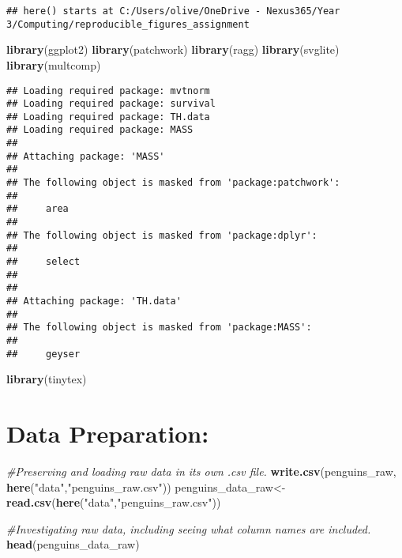 \documentclass[
]{article}
\newenvironment{Shaded}{\begin{snugshade}}{\end{snugshade}}
\newcommand{\CommentTok}[1]{\textcolor[rgb]{0.56,0.35,0.01}{\textit{#1}}}
\newcommand{\FunctionTok}[1]{\textcolor[rgb]{0.13,0.29,0.53}{\textbf{#1}}}
\newcommand{\NormalTok}[1]{#1}
\newcommand{\OtherTok}[1]{\textcolor[rgb]{0.56,0.35,0.01}{#1}}
\newcommand{\StringTok}[1]{\textcolor[rgb]{0.31,0.60,0.02}{#1}}
\begin{document}
\begin{verbatim}
## here() starts at C:/Users/olive/OneDrive - Nexus365/Year 3/Computing/reproducible_figures_assignment
\end{verbatim}

\begin{Shaded}
\begin{Highlighting}[]
\FunctionTok{library}\NormalTok{(ggplot2)}
\FunctionTok{library}\NormalTok{(patchwork)}
\FunctionTok{library}\NormalTok{(ragg)}
\FunctionTok{library}\NormalTok{(svglite)}
\FunctionTok{library}\NormalTok{(multcomp)}
\end{Highlighting}
\end{Shaded}

\begin{verbatim}
## Loading required package: mvtnorm
## Loading required package: survival
## Loading required package: TH.data
## Loading required package: MASS
## 
## Attaching package: 'MASS'
## 
## The following object is masked from 'package:patchwork':
## 
##     area
## 
## The following object is masked from 'package:dplyr':
## 
##     select
## 
## 
## Attaching package: 'TH.data'
## 
## The following object is masked from 'package:MASS':
## 
##     geyser
\end{verbatim}

\begin{Shaded}
\begin{Highlighting}[]
\FunctionTok{library}\NormalTok{(tinytex)}
\end{Highlighting}
\end{Shaded}

\section{Data Preparation:}\label{data-preparation}

\begin{Shaded}
\begin{Highlighting}[]
\CommentTok{\#Preserving and loading raw data in its own .csv file.}
\FunctionTok{write.csv}\NormalTok{(penguins\_raw, }\FunctionTok{here}\NormalTok{(}\StringTok{"data"}\NormalTok{,}\StringTok{"penguins\_raw.csv"}\NormalTok{))}
\NormalTok{penguins\_data\_raw}\OtherTok{\textless{}{-}}\FunctionTok{read.csv}\NormalTok{(}\FunctionTok{here}\NormalTok{(}\StringTok{"data"}\NormalTok{,}\StringTok{"penguins\_raw.csv"}\NormalTok{))}

\CommentTok{\#Investigating raw data, including seeing what column names are included.}
\FunctionTok{head}\NormalTok{(penguins\_data\_raw)}
\end{Highlighting}
\end{Shaded}
\end{document}
